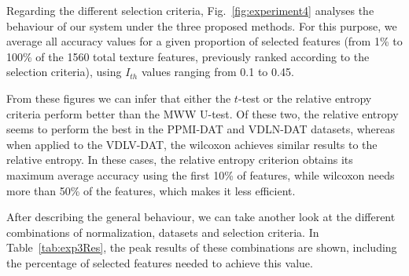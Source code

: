 Regarding the different selection criteria, Fig.~\ref{fig:experiment4} analyses the behaviour of our system under the three proposed methods. For this purpose, we average all accuracy values for a given proportion of selected features (from 1\% to 100\% of the 1560 total texture features, previously ranked according to the selection criteria), using $I_{th}$ values ranging from 0.1 to 0.45. 

From these figures we can infer that either the $t$-test or the relative entropy criteria perform better than the \ac{MWW} U-test. Of these two, the relative entropy seems to perform the best in the PPMI-DAT and VDLN-DAT datasets, whereas when applied to the VDLV-DAT, the wilcoxon achieves similar results to the relative entropy. In these cases, the relative entropy criterion obtains its maximum average accuracy using the first 10\% of features, while wilcoxon needs more than 50\% of the features, which makes it less efficient. 

After describing the general behaviour, we can take another look at the different combinations of normalization, datasets and selection criteria. In Table~\ref{tab:exp3Res}, the peak results of these combinations are shown, including the percentage of selected features needed to achieve this value. 

